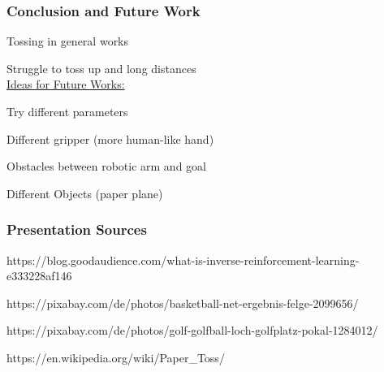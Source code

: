 
 



\begin{frame}
	\frametitle{Conclusion and Future Work}	
	\vspace{1cm}
	
    \begin{PraesentationAufzaehlung}
    	\item Tossing in general works
    	\item Struggle to toss up and long distances \\
        \vspace{\baselineskip}
    	\underline{Ideas for Future Works:}
    	\item Try different parameters
    	\item Different gripper (more human-like hand)
    	\item Obstacles between robotic arm and goal
    	\item Different Objects (paper plane)


    	
    \end{PraesentationAufzaehlung}
    
	
\end{frame}
\clearpage













\begin{frame}
	\frametitle{Presentation Sources}	
	\vspace{1cm}
	
	https://blog.goodaudience.com/what-is-inverse-reinforcement-learning-e333228af146
	
	https://pixabay.com/de/photos/basketball-net-ergebnis-felge-2099656/
	
	https://pixabay.com/de/photos/golf-golfball-loch-golfplatz-pokal-1284012/
	
	https://en.wikipedia.org/wiki/Paper\_Toss/
	
	
\end{frame}
\clearpage


